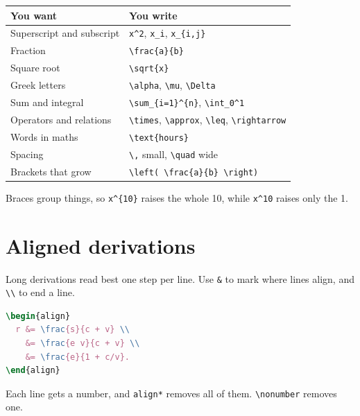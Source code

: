 {\def\LTcaptype{none} %
\begin{longtable}[]{@{}ll@{}}
\toprule\noalign{}
You want & You write \\
\midrule\noalign{}
\endhead
\bottomrule\noalign{}
\endlastfoot
Superscript and subscript & \texttt{x\^{}2}, \texttt{x\_i}, \texttt{x\_\{i,j\}} \\
Fraction & \texttt{\textbackslash{}frac\{a\}\{b\}} \\
Square root & \texttt{\textbackslash{}sqrt\{x\}} \\
Greek letters & \texttt{\textbackslash{}alpha}, \texttt{\textbackslash{}mu}, \texttt{\textbackslash{}Delta} \\
Sum and integral & \texttt{\textbackslash{}sum\_\{i=1\}\^{}\{n\}}, \texttt{\textbackslash{}int\_0\^{}1} \\
Operators and relations & \texttt{\textbackslash{}times}, \texttt{\textbackslash{}approx}, \texttt{\textbackslash{}leq}, \texttt{\textbackslash{}rightarrow} \\
Words in maths & \texttt{\textbackslash{}text\{hours\}} \\
Spacing & \texttt{\textbackslash{},} small, \texttt{\textbackslash{}quad} wide \\
Brackets that grow & \texttt{\textbackslash{}left(\ \textbackslash{}frac\{a\}\{b\}\ \textbackslash{}right)} \\
\end{longtable}
}

Braces group things, so \texttt{x\^{}\{10\}} raises the whole 10, while \texttt{x\^{}10} raises only the 1.

\section{Aligned derivations}\label{aligned-derivations}

Long derivations read best one step per line. Use \texttt{\&} to mark where lines align, and \texttt{\textbackslash{}\textbackslash{}} to end a line.

\begin{lstlisting}[language=latex]
\begin{align}
  r &= \frac{s}{c + v} \\
    &= \frac{e v}{c + v} \\
    &= \frac{e}{1 + c/v}.
\end{align}
\end{lstlisting}

Each line gets a number, and \texttt{align*} removes all of them. \texttt{\textbackslash{}nonumber} removes one.


